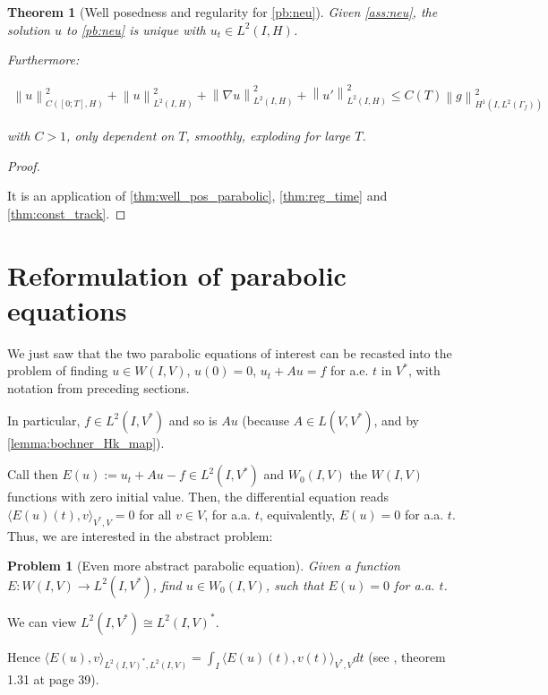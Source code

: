 \documentclass[english,a4paper,12pt,oneside]{scrbook}
\theoremstyle{break}
\newtheorem{thm}[equation]{Theorem}
\newtheorem{pb}[equation]{Problem}
\newenvironment{mproof}[1][\proofname]{%
  \begin{proof}[#1]$ $\par\nobreak\ignorespaces
}{%
  \end{proof}
}
\renewcommand*{\proofname}{Proof}
\theoremstyle{remark}
\newcommand{\norm}[1]{\left\lVert#1\right\rVert}
\begin{document}
\begin{thm}[Well posedness and regularity for \cref{pb:neu}]
\label{prop:wp_neu}
Given \cref{ass:neu}, the solution $u$ to \cref{pb:neu} is unique with $u_t \in L^2(I,H)$.

Furthermore: 

\begin{align}
\norm{u}^2_{C([0;T],H)}+\norm{u}_{L^2(I,H)}^2+ \norm{\nabla u}_{L^2(I,H)}^2 + \norm{u'}^2_{L^2(I,H)}\leq C(T)\norm{g}_{H^1(I,L^2(\Gamma_f))}^2
\end{align}

with $C>1$, only dependent on $T$, smoothly, exploding for large $T$.
\end{thm}
\begin{mproof}

It is an application of \cref{thm:well_pos_parabolic}, \cref{thm:reg_time} and \cref{thm:const_track}.
\end{mproof}

\section{Reformulation of parabolic equations}

We just saw that the two parabolic equations of interest can be recasted into the problem of finding $u\in W(I,V)$, $u(0)=0$, $u_t+Au=f$ for a.e. $t$ in $V^*$, with notation from preceding sections.

In particular, $f \in L^2(I, V^*)$ and so is $Au$ (because $A\in L(V,V^*)$, and by \ref{lemma:bochner_Hk_map}).

Call then $E(u):=u_t+Au-f \in L^2(I,V^*)$ and $W_0(I,V)$ the $W(I,V)$ functions with zero initial value. Then, the differential equation reads $\langle E(u)(t),v\rangle_{V^*,V}=0$ for all $v\in V$, for a.a. $t$, equivalently, $E(u)=0$ for a.a. $t$. Thus, we are interested in the abstract problem:

\begin{pb}[Even more abstract parabolic equation]
\label{pb:more_abstr_par}
Given a function $E: W(I,V)\rightarrow L^2(I,V^*)$, find $u\in W_0(I,V)$, such that $E(u)=0$ for a.a. $t$.
\end{pb}
 
We can view $L^2(I,V^*)\cong L^2(I,V)^*$.

Hence $\langle E(u), v\rangle_{L^2(I,V)^*, L^2(I,V)}=\int_I \langle E(u)(t),v(t) \rangle_{V^*,V} dt$ (see \cite{hinze}, theorem 1.31 at page 39).

\color{black}
\end{document}
